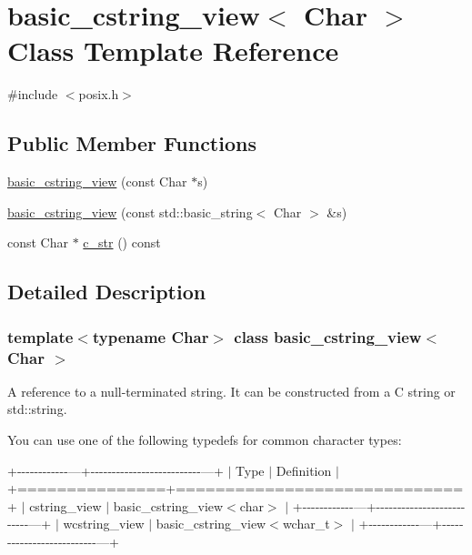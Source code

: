 \hypertarget{classbasic__cstring__view}{}\section{basic\+\_\+cstring\+\_\+view$<$ Char $>$ Class Template Reference}
\label{classbasic__cstring__view}


{\ttfamily \#include $<$posix.\+h$>$}

\subsection*{Public Member Functions}
\begin{DoxyCompactItemize}
\item 
\hyperlink{classbasic__cstring__view_ab464b2378652892cec4716d3e3d475c7}{basic\+\_\+cstring\+\_\+view} (const Char $\ast$s)
\item 
\hyperlink{classbasic__cstring__view_a10b92cc0e3e67789601984099b9ed339}{basic\+\_\+cstring\+\_\+view} (const std\+::basic\+\_\+string$<$ Char $>$ \&s)
\item 
const Char $\ast$ \hyperlink{classbasic__cstring__view_a19ace9be4e7617e5a978df29113279ee}{c\+\_\+str} () const
\end{DoxyCompactItemize}


\subsection{Detailed Description}
\subsubsection*{template$<$typename Char$>$\newline
class basic\+\_\+cstring\+\_\+view$<$ Char $>$}

A reference to a null-\/terminated string. It can be constructed from a C string or {\ttfamily std\+::string}.

You can use one of the following typedefs for common character types\+:

+-\/-\/-\/-\/-\/-\/-\/-\/-\/-\/-\/-\/---+-\/-\/-\/-\/-\/-\/-\/-\/-\/-\/-\/-\/-\/-\/-\/-\/-\/-\/-\/-\/-\/-\/-\/-\/-\/-\/---+ $\vert$ Type $\vert$ Definition $\vert$ +===============+=============================+ $\vert$ cstring\+\_\+view $\vert$ basic\+\_\+cstring\+\_\+view$<$char$>$ $\vert$ +-\/-\/-\/-\/-\/-\/-\/-\/-\/-\/-\/-\/---+-\/-\/-\/-\/-\/-\/-\/-\/-\/-\/-\/-\/-\/-\/-\/-\/-\/-\/-\/-\/-\/-\/-\/-\/-\/-\/---+ $\vert$ wcstring\+\_\+view $\vert$ basic\+\_\+cstring\+\_\+view$<$wchar\+\_\+t$>$ $\vert$ +-\/-\/-\/-\/-\/-\/-\/-\/-\/-\/-\/-\/---+-\/-\/-\/-\/-\/-\/-\/-\/-\/-\/-\/-\/-\/-\/-\/-\/-\/-\/-\/-\/-\/-\/-\/-\/-\/-\/---+

